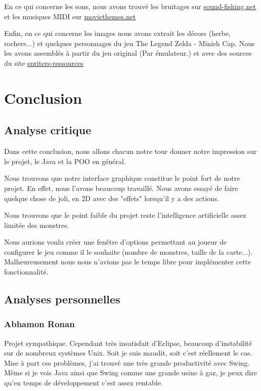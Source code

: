 \documentclass{article}
\begin{document}
En ce qui concerne les sons, nous avons trouvé les bruitages sur \href{http://www.sound-fishing.net}{sound-fishing.net} et les musiques MIDI sur \href{http://moviethemes.net/lord-rings.html}{moviethemes.net}

Enfin, en ce qui concerne les images nous avons extrait les décors (herbe, rochers...) et quelques personnages du jeu The Legend Zelda - Minish Cap. Nous les avons assemblés à partir du jeu original (Par émulateur.) et avec des sources du site \href{http://www.spriters-resource.com/}{spriters-ressources}

\section{Conclusion}
\subsection{Analyse critique}
Dans cette conclusion, nous allons chacun notre tour donner notre impression sur le projet, le Java et la POO en général.

Nous trouvons que notre interface graphique constitue le point fort de notre projet. En effet, nous l'avons beaucoup travaillé.
Nous avons essayé de faire quelque chose de joli, en 2D avec des "effets" lorsqu'il y a des actions.

Nous trouvons que le point faible du projet reste l'intelligence artificielle assez limitée des monstres.

Nous aurions voulu créer une fenêtre d'options permettant au joueur de configurer le jeu comme il le souhaite (nombre de monstres, taille de la carte...).
Malheureusement nous nous n'avions pas le temps libre pour implémenter cette fonctionnalité.

\subsection{Analyses personnelles}
  \subsubsection{Abhamon Ronan}
  Projet sympathique. Cependant très insatisfait d'Eclipse, beaucoup d'instabilité sur de nombreux systèmes Unix.
  Soit je suis maudit, soit c'est réellement le cas.
  Mise à part ces problèmes, j'ai trouvé une très grande productivité avec Swing.
  Même si je vois Java ainsi que Swing comme une grande usine à gaz, je peux dire qu'en temps de développement c'est assez rentable. 
\end{document}
